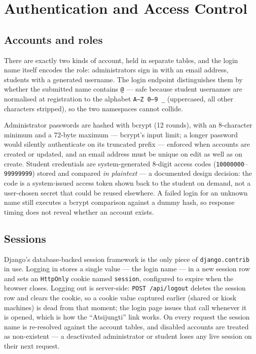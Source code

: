 \documentclass[11pt,a4paper]{article}
\newcommand{\code}[1]{\texttt{#1}}
\begin{document}
\section{Authentication and Access Control}
\label{sec:auth}

\subsection{Accounts and roles}

There are exactly two kinds of account, held in separate tables, and
the login name itself encodes the role: administrators sign in with an
email address, students with a generated username. The login endpoint
distinguishes them by whether the submitted name contains \code{@} ---
safe because student usernames are normalised at registration to the
alphabet \code{A--Z 0--9 \_} (uppercased, all other characters
stripped), so the two namespaces cannot collide.

Administrator passwords are hashed with bcrypt (12 rounds), with an
8-character minimum and a 72-byte maximum --- bcrypt's input limit; a
longer password would silently authenticate on its truncated prefix ---
enforced when accounts are created or updated, and an email address
must be unique on edit as well as on create.
Student credentials are system-generated 8-digit access codes
(\code{10000000}--\code{99999999}) stored and compared \emph{in
plaintext} --- a documented design decision: the code is a
system-issued access token shown back to the student on demand, not a
user-chosen secret that could be reused elsewhere. A failed login for
an unknown name still executes a bcrypt comparison against a dummy
hash, so response timing does not reveal whether an account exists.

\subsection{Sessions}

Django's database-backed session framework is the only piece of
\code{django.contrib} in use. Logging in stores a single value --- the
login name --- in a new session row and sets an \code{HttpOnly} cookie
named \code{session}, configured to expire when the browser closes.
Logging out is server-side: \code{POST /api/logout} deletes the session
row and clears the cookie, so a cookie value captured earlier (shared
or kiosk machines) is dead from that moment; the login page issues that
call whenever it is opened, which is how the ``Atsijungti'' link works.
On every request the session name is re-resolved against the account
tables, and disabled accounts are treated as non-existent --- a
deactivated administrator or student loses any live session on their
next request.
\end{document}
